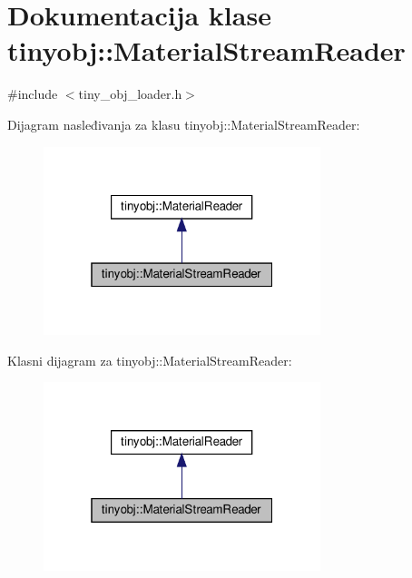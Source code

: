 \hypertarget{classtinyobj_1_1MaterialStreamReader}{}\section{Dokumentacija klase tinyobj\+:\+:Material\+Stream\+Reader}
\label{classtinyobj_1_1MaterialStreamReader}


{\ttfamily \#include $<$tiny\+\_\+obj\+\_\+loader.\+h$>$}



Dijagram nasleđivanja za klasu tinyobj\+:\+:Material\+Stream\+Reader\+:
\nopagebreak
\begin{figure}[H]
\begin{center}
\leavevmode
\includegraphics[width=229pt]{classtinyobj_1_1MaterialStreamReader__inherit__graph}
\end{center}
\end{figure}


Klasni dijagram za tinyobj\+:\+:Material\+Stream\+Reader\+:
\nopagebreak
\begin{figure}[H]
\begin{center}
\leavevmode
\includegraphics[width=229pt]{classtinyobj_1_1MaterialStreamReader__coll__graph}
\end{center}
\end{figure}
